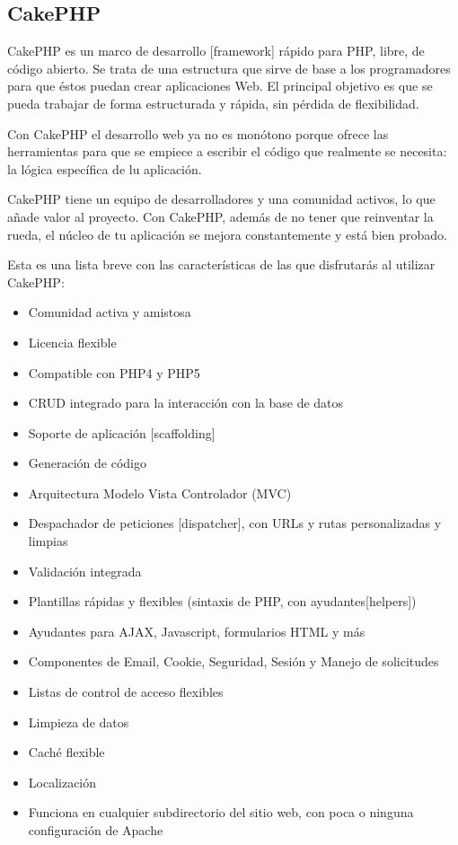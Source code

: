  \newpage

\subsection{CakePHP}

CakePHP es un marco de desarrollo [framework] rápido para PHP, libre, de código abierto. Se trata de una estructura que sirve de base a los programadores para que éstos puedan crear aplicaciones Web. El principal objetivo es que se pueda trabajar de forma estructurada y rápida, sin pérdida de flexibilidad.

Con CakePHP el desarrollo web ya no es monótono porque ofrece las herramientas para que se empiece a escribir el código que realmente  se necesita: la lógica específica de lu aplicación. 

CakePHP tiene un equipo de desarrolladores y una comunidad activos, lo que añade valor al proyecto. Con CakePHP, además de no tener que reinventar la rueda, el núcleo de tu aplicación se mejora constantemente y está bien probado.

Esta es una lista breve con las características de las que disfrutarás al utilizar CakePHP:

\begin{itemize}

\item Comunidad activa y amistosa
\item Licencia flexible
\item Compatible con PHP4 y PHP5
\item CRUD integrado para la interacción con la base de datos
\item Soporte de aplicación [scaffolding]
\item Generación de código
\item Arquitectura Modelo Vista Controlador (MVC)
\item Despachador de peticiones [dispatcher], con URLs y rutas personalizadas y limpias
\item Validación integrada
\item Plantillas rápidas y flexibles (sintaxis de PHP, con ayudantes[helpers])
\item Ayudantes para AJAX, Javascript, formularios HTML y más
\item Componentes de Email, Cookie, Seguridad, Sesión y Manejo de solicitudes
\item Listas de control de acceso flexibles
\item Limpieza de datos
\item Caché flexible
\item Localización
\item Funciona en cualquier subdirectorio del sitio web, con poca o ninguna configuración de Apache

\end{itemize}

